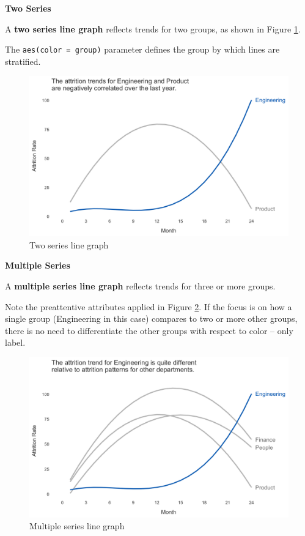 \documentclass[
]{book}
\begin{document}
\textbf{Two Series}

A \textbf{two series line graph} reflects trends for two groups, as shown in Figure \ref{fig:dbl-line-graph}.

The \texttt{aes(color\ =\ group)} parameter defines the group by which lines are stratified.

\begin{figure}

{\centering \includegraphics[width=1\linewidth]{graphics/line_graph_double} 

}

\caption{Two series line graph}\label{fig:dbl-line-graph}
\end{figure}

\textbf{Multiple Series}

A \textbf{multiple series line graph} reflects trends for three or more groups.

Note the preattentive attributes applied in Figure \ref{fig:multi-line-graph}. If the focus is on how a single group (Engineering in this case) compares to two or more other groups, there is no need to differentiate the other groups with respect to color -- only label.

\begin{figure}

{\centering \includegraphics[width=1\linewidth]{graphics/line_graph_multi} 

}

\caption{Multiple series line graph}\label{fig:multi-line-graph}
\end{figure}
\end{document}
